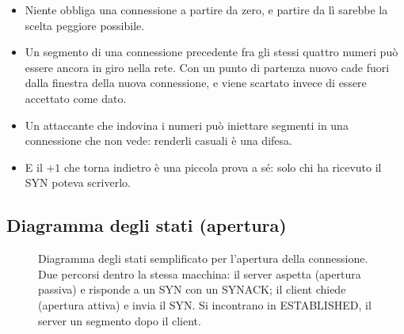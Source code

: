 \begin{itemize}
    \item Niente obbliga una connessione a partire da zero, e partire da lì sarebbe la scelta peggiore possibile.
    \item Un segmento di una connessione precedente fra gli stessi quattro numeri può essere ancora in giro nella rete. Con un
          punto di partenza nuovo cade fuori dalla finestra della nuova connessione, e viene scartato invece di essere
          accettato come dato.
    \item Un attaccante che indovina i numeri può iniettare segmenti in una connessione che non vede: renderli casuali è una
          difesa.
    \item E il $+1$ che torna indietro è una piccola prova a sé: solo chi ha ricevuto il SYN poteva scriverlo.
\end{itemize}

\subsection{Diagramma degli stati (apertura)}

\begin{figure}[H]
\centering
{}
\caption{Diagramma degli stati semplificato per l'apertura della connessione. Due percorsi dentro la stessa macchina: il
         server aspetta (apertura passiva) e risponde a un SYN con un SYNACK; il client chiede (apertura attiva) e invia il
         SYN. Si incontrano in ESTABLISHED, il server un segmento dopo il client.}
\end{figure}


